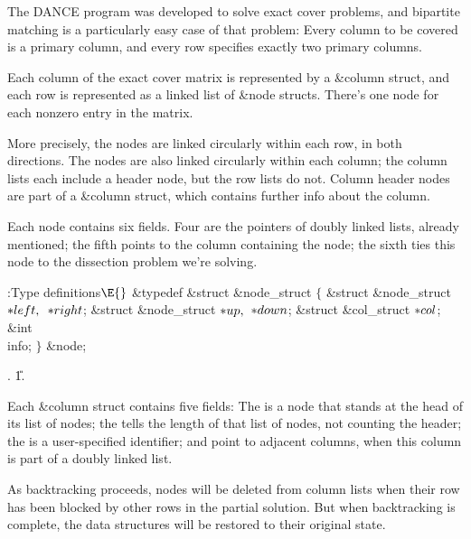 The {\mc DANCE} program was developed to solve exact cover problems,
and bipartite matching is a particularly easy case of that problem:
Every column to be covered is a primary column, and every row specifies
exactly two primary columns.

Each column of the exact cover matrix is represented by a \&{column} struct,
and each row is represented as a linked list of \&{node} structs. There's one
node for each nonzero entry in the matrix.

More precisely, the nodes are linked circularly within each row, in
both directions. The nodes are also linked circularly within each column;
the column lists each include a header node, but the row lists do not.
Column header nodes are part of a \&{column} struct, which
contains further info about the column.

Each node contains six fields. Four are the pointers of doubly linked lists,
already mentioned; the fifth points to the column containing the node;
the sixth ties this node to the dissection problem we're solving.

\Y\B\4:Type definitions\X${}\E{}$\6
\&{typedef} \&{struct} \&{node\_struct} ${}\{{}$\1\6
\&{struct} \&{node\_struct} ${}{*}\\{left},{}$ ${}{*}\\{right}{}$;\6
\&{struct} \&{node\_struct} ${}{*}\\{up},{}$ ${}{*}\\{down}{}$;\6
\&{struct} \&{col\_struct} ${}{*}\\{col}{}$;\6
\&{int} \\{info};%
\2\6
${}\}{}$ \&{node};\par
{}.
\U1.\fi

Each \&{column} struct contains five fields:
The  is a node that stands at the head of its list of nodes;
the  tells the length of that list of nodes, not counting the
header;
the  is a user-specified identifier;
 and  point to adjacent columns, when this
column is part of a doubly linked list.

As backtracking proceeds, nodes
will be deleted from column lists when their row has been blocked by
other rows in the partial solution.
But when backtracking is complete, the data structures will be
restored to their original state.

